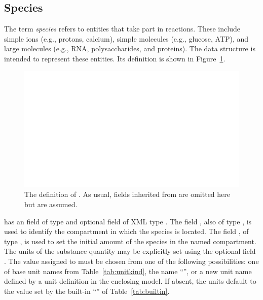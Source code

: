 \documentclass[10pt]{cekarticle}
\newcommand{\vref}[1]{\ref{#1}}
\begin{document}
\subsection{Species}
\label{sec:species}

The term \emph{species} refers to entities that take part in
reactions. These include simple ions (e.g., protons, calcium),
simple molecules (e.g., glucose, ATP), and large molecules (e.g.,
RNA, polysaccharides, and proteins).  The  data
structure is intended to represent these entities.  Its definition
is shown in Figure~\vref{fig:species}.

\begin{figure}[htb]
  \centering
  \includegraphics[scale = 0.68]{specie}
  \caption{The definition of .  As usual, fields inherited from
     are omitted here but are assumed.}
  \label{fig:species}
\end{figure}

 has an  field of type  and
optional  field of XML type . The field
, also of type , is used to
identify the compartment in which the species is located. The
field , of type , is used to
set the initial amount of the species in the named compartment.
The units of the substance quantity may be explicitly set using
the optional field . The value assigned to
 must be chosen from one of the following
possibilities: one of base unit names from
Table~\vref{tab:unitkind}, the name ``'', or a new
unit name defined by a unit definition in the enclosing model.  If
absent, the units default to the value set by the built-in
``'' of Table~\vref{tab:builtin}.
\end{document}
